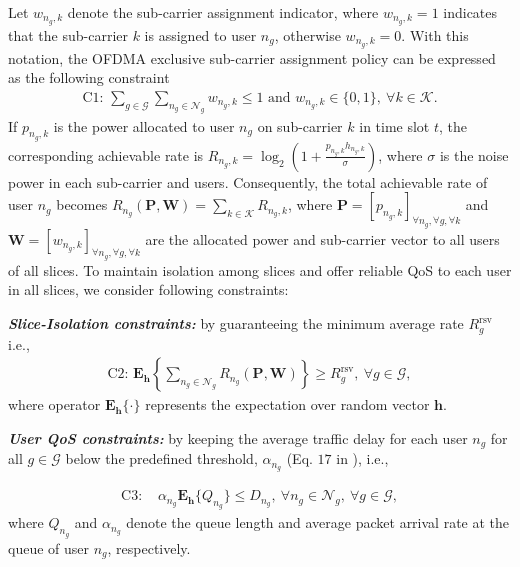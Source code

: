 \documentclass[journal,draftclsnofoot,12pt,onecolumn]{IEEEtran}
\begin{document}
Let $w_{n_g,k}$ denote the {sub-carrier assignment indicator,} where $w_{n_g,k} = 1$ indicates that the sub-carrier $k$ is assigned to user $n_g$, otherwise $w_{n_g,k} = 0$. With this notation, the OFDMA exclusive sub-carrier assignment policy can be expressed as the following constraint
\begin{align}
\text{C1: }\sum\limits_{g\in \mathcal{G}}\sum\limits_{n_g \in \mathcal{N}_g}w_{n_g,k} \leq 1 \text{ and } w_{n_g,k} \in \{0,1\}, ~\forall k \in \mathcal{K}.\nonumber
\end{align}
If $p_{n_g,k}$ is the power allocated to user $n_g$ on sub-carrier $k$ in time slot $t$, the corresponding achievable rate is $R_{n_g,k}= \log_2(1 + \frac{p_{n_g,k}h_{n_g,k}}{\sigma })$, where $\sigma$ is the noise power in each sub-carrier and users. Consequently, the total achievable rate of user $n_g$ becomes $R_{n_g}(\textbf{P},\textbf{W}) = \sum\limits_{k \in \mathcal{K}}R_{n_g,k}$, where $\textbf{P}=[p_{n_g,k}]_{\forall n_g, \forall g, \forall k}$ and  $\textbf{W}=[ w_{n_g,k}]_{\forall n_g, \forall g, \forall k}$ are the allocated power and sub-carrier vector to all users of all slices. To maintain isolation among slices and offer reliable QoS to each user in all slices, we consider following constraints:
\begin{itemize}
\item \textit{\textbf{Slice-Isolation constraints:}} by guaranteeing the minimum average rate $R_g^\text{rsv}$ i.e.,
\begin{align}
\text{C2: } \textbf{E}_{\textbf{h}}\left\lbrace \sum\limits_{n_g \in \mathcal{N}_g}R_{n_g}(\textbf{P},\textbf{W})\right\rbrace   \geq R_g^\text{rsv}, ~\forall g \in \mathcal{G}, \nonumber
\end{align}
where operator $\textbf{E}_{\textbf{h}}\{\cdot\}$ represents the expectation over random vector $\textbf{h}$.
{\item \textit{\textbf{User QoS constraints:}} by keeping the average traffic delay for each user $n_g$ for all $g \in \mathcal{G}$ below the predefined threshold, $\alpha_{n_g}$ (Eq. $17$ in \cite{6157070} ), i.e., }
\begin{align}
\text{C3: } & {\alpha}_{n_g}\textbf{E}_{\textbf{h}}\{Q_{n_g}\}  \leq {D}_{n_g},~\forall n_g \in \mathcal{N}_g, ~\forall g \in \mathcal{G},\nonumber
\end{align}
where $Q_{n_g}$ and $ {\alpha}_{n_g}$ denote the queue length and average packet arrival rate at the queue of user $n_g$, respectively.
\end{itemize}
\end{document}
